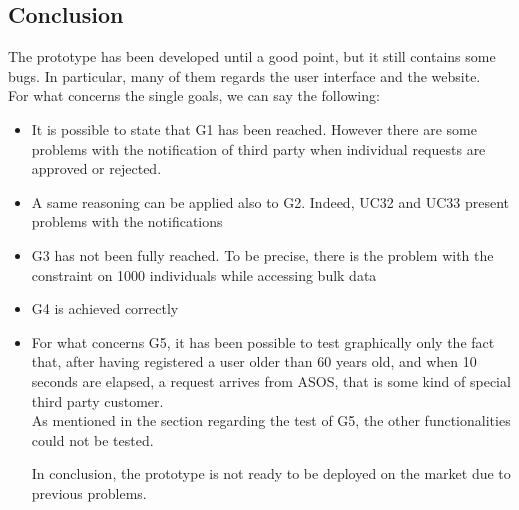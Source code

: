 \subsection{Conclusion}
The prototype has been developed until a good point, but it still contains some bugs. In particular, many of them regards the user interface
and the website. \\
For what concerns the single goals, we can say the following:

\begin{itemize}
\item
It is possible to state that G1 has been reached. However there are some problems with the notification of third party when individual
requests are approved or rejected.

\item
A same reasoning can be applied also to G2. Indeed, UC32 and UC33 present problems with the notifications

\item
G3 has not been fully reached. To be precise, there is the problem with the constraint on 1000 individuals while accessing bulk data

\item 
G4 is achieved correctly

\item 
For what concerns G5, it has been possible to test graphically only the fact that, after having registered a user older than 60 years old, 
and when 10 seconds are elapsed, a request arrives from ASOS, that is some kind of special third party customer. \\
As mentioned in the section regarding the test of G5, the other functionalities could not be tested.\\

\par
In conclusion, the prototype is not ready to be deployed on the market due to previous problems.

\end{itemize}

